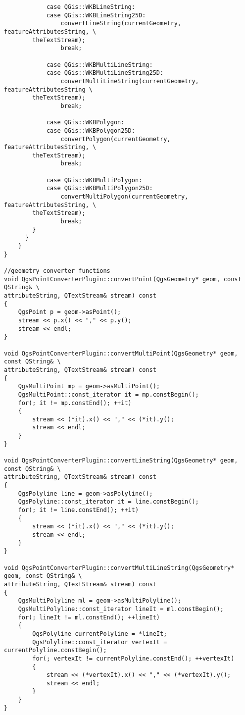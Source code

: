 \begin{verbatim}
            case QGis::WKBLineString:
            case QGis::WKBLineString25D:
                convertLineString(currentGeometry, featureAttributesString, \
		theTextStream);
                break;

            case QGis::WKBMultiLineString:
            case QGis::WKBMultiLineString25D:
                convertMultiLineString(currentGeometry, featureAttributesString \
		theTextStream);
                break;

            case QGis::WKBPolygon:
            case QGis::WKBPolygon25D:
                convertPolygon(currentGeometry, featureAttributesString, \
		theTextStream);
                break;

            case QGis::WKBMultiPolygon:
            case QGis::WKBMultiPolygon25D:
                convertMultiPolygon(currentGeometry, featureAttributesString, \
		theTextStream);
                break;
        }
      }
    }
}

//geometry converter functions
void QgsPointConverterPlugin::convertPoint(QgsGeometry* geom, const QString& \
attributeString, QTextStream& stream) const
{
    QgsPoint p = geom->asPoint();
    stream << p.x() << "," << p.y();
    stream << endl;
}

void QgsPointConverterPlugin::convertMultiPoint(QgsGeometry* geom, const QString& \
attributeString, QTextStream& stream) const
{
    QgsMultiPoint mp = geom->asMultiPoint();
    QgsMultiPoint::const_iterator it = mp.constBegin();
    for(; it != mp.constEnd(); ++it)
    {
        stream << (*it).x() << "," << (*it).y();
        stream << endl;
    }
}

void QgsPointConverterPlugin::convertLineString(QgsGeometry* geom, const QString& \
attributeString, QTextStream& stream) const
{
    QgsPolyline line = geom->asPolyline();
    QgsPolyline::const_iterator it = line.constBegin();
    for(; it != line.constEnd(); ++it)
    {
        stream << (*it).x() << "," << (*it).y();
        stream << endl;
    }
}

void QgsPointConverterPlugin::convertMultiLineString(QgsGeometry* geom, const QString& \
attributeString, QTextStream& stream) const
{
    QgsMultiPolyline ml = geom->asMultiPolyline();
    QgsMultiPolyline::const_iterator lineIt = ml.constBegin();
    for(; lineIt != ml.constEnd(); ++lineIt)
    {
        QgsPolyline currentPolyline = *lineIt;
        QgsPolyline::const_iterator vertexIt = currentPolyline.constBegin();
        for(; vertexIt != currentPolyline.constEnd(); ++vertexIt)
        {
            stream << (*vertexIt).x() << "," << (*vertexIt).y();
            stream << endl;
        }
    }
}


\end{verbatim}
